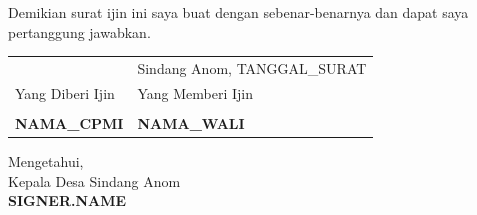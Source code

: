 \documentclass[a4paper, 12pt]{article}
\begin{document}
Demikian surat ijin ini saya buat dengan sebenar-benarnya dan dapat saya pertanggung jawabkan.
\vspace{1cm}

\noindent
\begin{tabularx}{\textwidth}{@{} >{\centering\arraybackslash}X >{\centering\arraybackslash}X @{}}
    & Sindang Anom, {{TANGGAL_SURAT}} \tabularnewline
    Yang Diberi Ijin & Yang Memberi Ijin \tabularnewline
    \vspace{2cm} & \vspace{2cm} \tabularnewline
    \textbf{{{NAMA_CPMI}}} & \textbf{{{NAMA_WALI}}} \tabularnewline
\end{tabularx}

\vspace{0.5cm}

\begin{center}
    Mengetahui,\\
    Kepala Desa Sindang Anom \\
    \vspace{2.5cm}
    \textbf{{{SIGNER.NAME}}}
\end{center}
\end{document}
